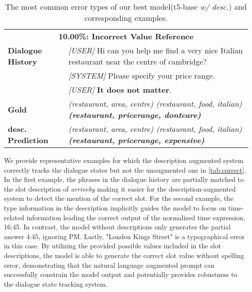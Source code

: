 \documentclass[11pt]{article}
\begin{document}
\begin{table*}[t!]
\begin{tabular}{lp{12.0cm}}
         \midrule
        \multicolumn{2}{c}{\textbf{10.00\%: Incorrect Value Reference}} \\
        \textbf{Dialogue History}  & \textit{[USER]} Hi can you help me find a very nice Italian restaurant near the centre of cambridge? \\ 
        & \textit{[SYSTEM]} Please specify your price range.\\
        & \textit{[USER]} \textbf{It does not matter}. \\
        \textbf{Gold} & \textit{(restaurant, area, centre) (restaurant, food, italian) \textbf{(restaurant, pricerange, dontcare)}} \\
        \textbf{desc. Prediction} & \textit{(restaurant, area, centre) (restaurant, food, italian) \textbf{(restaurant, pricerange, expensive)}} \\
        \bottomrule
    \end{tabular}
        \caption{The most common error types of our best model(t5-base \textit{w/ desc.}) and corresponding examples.}
    \label{tab:error}
\end{table*}


We provide representative examples for which the description augmented system correctly tracks the dialogue states but not the unaugmented one in \autoref{tab:correct}. In the first example, the phrases in the dialogue history are partially matched to the slot description of \textit{arriveby} making it easier for the description-augmented system to detect the mention of the correct slot. For the second example, the type information in the description implicitly guides the model to focus on time-related information leading the correct output of the normalized time expression, 16:45. In contrast, the model without descriptions only generates the partial answer 4:45, ignoring PM. Lastly, "London Kings Street" is a typographical error in this case. By utilizing the provided possible values included in the slot descriptions, the model is able to generate the correct slot value without spelling error, demonstrating that the natural language augmented prompt can successfully constrain the model output and potentially provides robustness to the dialogue state tracking system.

\vspace{-3mm}
\end{document}
